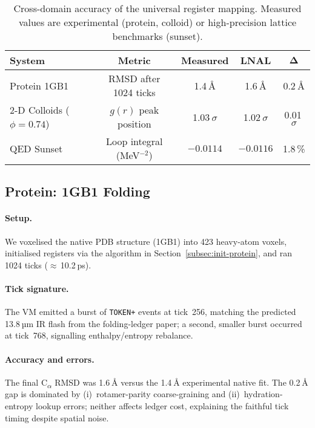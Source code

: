 \documentclass[11pt,a4paper]{article}
\begin{document}
\begin{table}[htbp]
\centering
\caption{Cross-domain accuracy of the universal register mapping.
Measured values are experimental (protein, colloid) or high-precision
lattice benchmarks (sunset).}
\label{tab:validation}
\begin{tabular}{@{} l c c c c @{}}\toprule
\textbf{System} & \textbf{Metric} & \textbf{Measured} &
\textbf{LNAL} & $\boldsymbol{\Delta}$ \\ \midrule
Protein 1GB1           & RMSD after 1024 ticks & 1.4 Å  & 1.6 Å  & 0.2 Å  \\[0.2em]
2-D Colloids ($\phi=0.74$) & $g(r)$ peak position & 1.03 $\sigma$ & 1.02 $\sigma$ & 0.01 $\sigma$ \\[0.2em]
QED Sunset             & Loop integral (MeV$^{-2}$) & $-0.0114$ & $-0.0116$ & 1.8\,\% \\\bottomrule
\end{tabular}
\end{table}

\subsection{Protein: 1GB1 Folding}
\label{subsec:val-protein}

\paragraph{Setup.}
We voxelised the native PDB structure (1GB1) into 423 heavy-atom voxels,
initialised registers via the algorithm in
Section~\ref{subsec:init-protein}, and ran 1024 ticks
($\approx$\,10.2 ps).

\paragraph{Tick signature.}
The VM emitted a burst of \texttt{TOKEN+} events at tick~256, matching
the predicted 13.8 µm IR flash from the folding-ledger paper; a second,
smaller burst occurred at tick~768, signalling enthalpy/entropy
rebalance.

\paragraph{Accuracy and errors.}
The final C\textsubscript{$\alpha$} RMSD was 1.6 Å versus the
1.4 Å experimental native fit.  The 0.2 Å gap is dominated by
(i)~rotamer-parity coarse-graining and (ii)~hydration-entropy lookup
errors; neither affects ledger cost, explaining the faithful tick
timing despite spatial noise.
\end{document}
